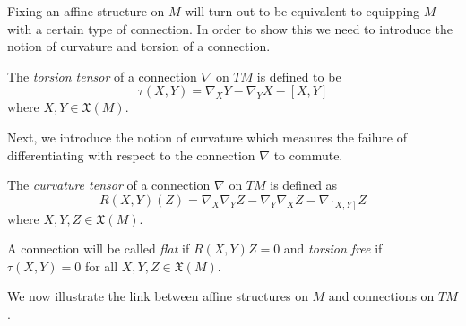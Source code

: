 Fixing an affine structure on $M$ will turn out to be equivalent to equipping
$M$ with a certain type of connection. In order to show this we need to
introduce the notion of curvature and torsion of a connection.

\begin{definition}
    The \emph{torsion tensor} of a connection $\nabla$ on $TM$ is defined to be
    $$
        \tau(X,Y) = \nabla_X Y - \nabla_Y X - [X,Y]
    $$
    where $X,Y \in \mathfrak{X}(M)$.
\end{definition}

Next, we introduce the notion of curvature which measures the failure of
differentiating with respect to the connection $\nabla$ to commute.

\begin{definition}
    The \emph{curvature tensor} of a connection $\nabla$ on $TM$ is defined as
    $$
        R(X,Y)(Z) = \nabla_X \nabla_Y Z - \nabla_Y \nabla_X Z - \nabla_{[X,Y]}Z
    $$
    where $X,Y,Z \in \mathfrak{X}(M)$.
\end{definition}
\begin{definition}
    A connection will be called \emph{flat} if $R(X,Y)Z = 0$ and \emph{torsion free} if $\tau(X,Y)=0$ for all $X,Y, Z \in \mathfrak{X}(M)$.
\end{definition}

We now illustrate the link between affine structures on $M$ and connections on
$TM$.

